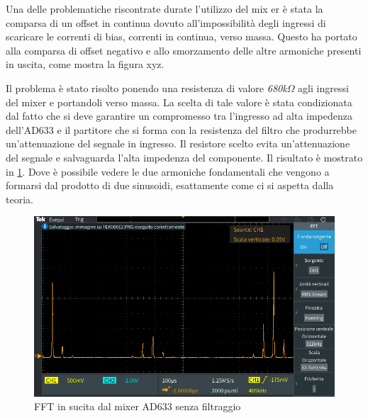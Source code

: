 \documentclass[titlepage]{report}
\begin{document}
Una delle problematiche riscontrate durate l'utilizzo del mix er è stata la comparsa di un offset in continua dovuto all'impossibilità degli ingressi di scaricare le correnti di bias, correnti in continua, verso massa. Questo ha portato alla comparsa di offset negativo e allo smorzamento delle altre armoniche presenti in uscita, come mostra la figura xyz.



Il problema è stato risolto ponendo una resistenza di valore \textit{680k$\Omega$} agli ingressi del mixer e portandoli verso massa. La scelta di tale valore è stata condizionata dal fatto che si deve garantire un compromesso tra l'ingresso ad alta impedenza dell'AD633 e il partitore che si forma con la resistenza del filtro che produrrebbe un'attenuazione del segnale in ingresso. Il resistore scelto evita un'attenuazione del segnale e salvaguarda l'alta impedenza del componente. Il risultato è mostrato in \ref{fig:FFTAD633}. Dove è possibile vedere le due armoniche fondamentali che vengono a formarsi dal prodotto di due sinusoidi, esattamente come ci si aspetta dalla teoria. %
	
	

	\begin{figure}[H]
		\centering
		\includegraphics[scale = 0.5]{Immagini/ad633_fft_mixed.PNG}
		\caption{FFT in sucita dal mixer AD633 senza filtraggio}
		\label{fig:FFTAD633}
	\end{figure}
\end{document}
